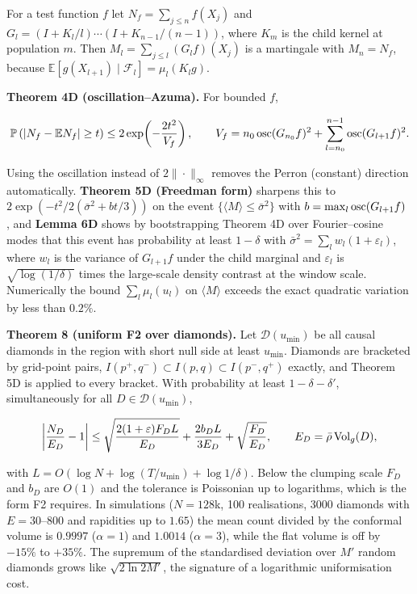 For a test function \(f\) let \(N_f=\sum_{j\le n}f(X_j)\)
and \(G_l=(I+K_l/l)\cdots(I+K_{n-1}/(n-1))\), where \(K_m\)
is the child kernel at population \(m\). Then
\(M_l=\sum_{j\le l}(G_lf)(X_j)\) is a martingale with
\(M_n=N_f\), because
\(\mathbb{E}[g(X_{l+1})\mid\mathcal F_l]=\mu_l(K_lg)\).

\textbf{Theorem 4D (oscillation--Azuma).} For bounded \(f\),

\[\mathbb{P}\left(|N_f-\mathbb{E}N_f|\ge t\right)\le2\exp\!\left(-\frac{2t^2}{V_f}\right),\qquad V_f=n_0\,{\rm osc}(G_{n_0}f)^2+\sum_{l=n_0}^{n-1}{\rm osc}(G_{l+1}f)^2 .\]

Using the oscillation instead of \(2\|\cdot\|_\infty\)
removes the Perron (constant) direction automatically.
\textbf{Theorem 5D (Freedman form)} sharpens this to
\(2\exp(-t^2/2(\bar\sigma^2+bt/3))\) on the event
\(\{\langle M\rangle\le\bar\sigma^2\}\) with
\(b=\max_l{\rm osc}(G_{l+1}f)\) \cite{Freedman75}, and
\textbf{Lemma 6D} shows by bootstrapping Theorem 4D over
Fourier--cosine modes that this event has probability at
least \(1-\delta\) with
\(\bar\sigma^2=\sum_lw_l(1+\varepsilon_l)\), where \(w_l\)
is the variance of \(G_{l+1}f\) under the child marginal and
\(\varepsilon_l\) is \(\sqrt{\log(1/\delta)}\) times the
large-scale density contrast at the window scale.
Numerically the bound \(\sum_l\mu_l(u_l)\) on
\(\langle M\rangle\) exceeds the exact quadratic variation
by less than \(0.2\%\).

\textbf{Theorem 8 (uniform F2 over diamonds).} Let
\(\mathcal D(u_{\min})\) be all causal diamonds in the
region with short null side at least \(u_{\min}\). Diamonds
are bracketed by grid-point pairs,
\(I(p^+,q^-)\subset I(p,q)\subset I(p^-,q^+)\) exactly, and
Theorem 5D is applied to every bracket. With probability at
least \(1-\delta-\delta'\), simultaneously for all
\(D\in\mathcal D(u_{\min})\),

\[\left|\frac{N_D}{E_D}-1\right|\le\sqrt{\frac{2(1+\varepsilon)F_DL}{E_D}}+\frac{2b_DL}{3E_D}+\sqrt{\frac{F_D}{E_D}},\qquad E_D=\bar\rho\,{\rm Vol}_g(D),\]

with \(L=O(\log N+\log(T/u_{\min})+\log1/\delta)\). Below
the clumping scale \(F_D\) and \(b_D\) are \(O(1)\) and the
tolerance is Poissonian up to logarithms, which is the form
F2 requires. In simulations (\(N=128\)k, 100 realisations,
3000 diamonds with \(E=30\)--\(800\) and rapidities up to
\(1.65\)) the mean count divided by the conformal volume is
\(0.9997\) (\(\alpha=1\)) and \(1.0014\) (\(\alpha=3\)),
while the flat volume is off by \(-15\%\) to \(+35\%\). The
supremum of the standardised deviation over \(M'\) random
diamonds grows like \(\sqrt{2\ln2M'}\), the signature of a
logarithmic uniformisation cost.

